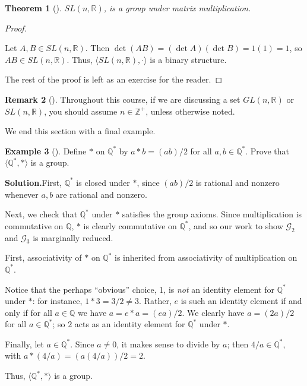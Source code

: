 \documentclass[10pt,openany,oneside]{book}
\theoremstyle{plain}
\newtheorem{theorem}{Theorem}[section]
\theoremstyle{definition}
\theoremstyle{definition}
\newtheorem{remark}[theorem]{Remark}
\theoremstyle{definition}
\newtheorem{example}[theorem]{Example}
\theoremstyle{definition}
\numberwithin{equation}{section}
\def\Z{\mathbb{Z}}
\def\R{\mathbb{R}}
\def\Q{\mathbb{Q}}
\def\G{\mathcal{G}}
\begin{document}
\begin{theorem}[{}]\label{sl}
\(SL(n,\R)\), is a group under matrix multiplication.%
\end{theorem}
\begin{proof}\hypertarget{proof-8}{}
Let \(A,B\in SL(n, \R)\). Then \(\det(AB)=(\det A)(\det B) =1(1)=1\), so \(AB\in SL(n,\R)\).  Thus, \(\langle SL(n,\R), \cdot\rangle\) is a binary structure.%
\par
The rest of the proof is left as an exercise for the reader.%
\end{proof}
\begin{remark}[]\label{remark-8}
Throughout this course, if we are discussing a set \(GL(n,\R)\) or \(SL(n,\R)\), you should assume \(n\in \Z^+\), unless otherwise noted.%
\end{remark}
We end this section with a final example.%
\begin{example}[]\label{example-12}
Define \(*\) on \(\Q^*\) by \(a*b=(ab)/2\) for all \(a,b\in \Q^*\). Prove that \(\langle \Q^*,*\rangle\) is a group.%
\par\medskip\noindent%
\textbf{Solution.}\quad First, \(\Q^*\) is closed under \(*\), since \((ab)/2\) is rational and nonzero whenever \(a,b\) are rational and nonzero.%
\par
Next, we check that \(\Q^*\) under \(*\) satisfies the group axioms. Since multiplication is commutative on \(\Q\), \(*\) is clearly commutative on \(\Q^*\), and so our work to show \(\G_2\) and \(\G_3\) is marginally reduced.%
\par
First, associativity of \(*\) on \(\Q^*\) is inherited from associativity of multiplication on \(\Q^*\).%
\par
Notice that the perhaps ``obvious'' choice, 1, is \emph{not} an identity element for \(\Q^*\) under \(*\): for instance, \(1*3=3/2 \neq 3\). Rather, \(e\) is such an identity element if and only if for all \(a\in \Q\) we have \(a=e*a=(ea)/2\). We clearly have \(a=(2a)/2\) for all \(a\in \Q^*\); so \(2\) acts as an identity element for \(\Q^*\) under \(*\).%
\par
Finally, let \(a\in \Q^*\).  Since \(a\neq 0\), it makes sense to divide by \(a\); then \(4/a\in \Q^*\), with \(a*(4/a)=(a(4/a))/2=2\).%
\par
Thus, \(\langle \Q^*,*\rangle\) is a group.%
\end{example}
\typeout{************************************************}
\typeout{************************************************}
\end{document}
